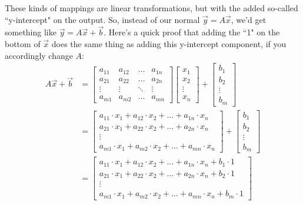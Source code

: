 \documentclass{article}
\begin{document}
These kinds of mappings are linear transformations, but with the added so-called ``y-intercept" on the output. So, instead of our normal $\vec{y} = A\vec{x}$, we'd get something like $\vec{y} = A\vec{x} + \vec{b}$. Here's a quick proof that adding the ``1" on the bottom of $\vec{x}$ does the same thing as adding this y-intercept component, if you accordingly change $A$: \\

\begin{align*}
A\vec{x} + \vec{b} 
&= 
\begin{bmatrix}
a_{11} & a_{12} & \hdots & a_{1n} \\
a_{21} & a_{22} & \hdots & a_{2n} \\
\vdots & \vdots & \ddots & \vdots \\
a_{m1} & a_{m2} & \hdots & a_{mn}
\end{bmatrix}
\begin{bmatrix}
x_1 \\ x_2 \\ \vdots \\ x_n
\end{bmatrix} +
\begin{bmatrix}
b_1 \\ b_2 \\ \vdots \\ b_m
\end{bmatrix} \\
& = 
\begin{bmatrix}
a_{11}\cdot x_1 + a_{12}\cdot x_2 + \hdots + a_{1n}\cdot x_n \\
a_{21}\cdot x_1 + a_{22}\cdot x_2 + \hdots + a_{2n}\cdot x_n \\
\vdots \\
a_{m1}\cdot x_1 + a_{m2}\cdot x_2 + \hdots + a_{mn}\cdot x_n
\end{bmatrix} +
\begin{bmatrix}
b_1 \\ b_2 \\ \vdots \\ b_m
\end{bmatrix} \\
&=
\begin{bmatrix}
a_{11}\cdot x_1 + a_{12}\cdot x_2 + \hdots + a_{1n}\cdot x_n + b_1 \cdot 1\\
a_{21}\cdot x_1 + a_{22}\cdot x_2 + \hdots + a_{2n}\cdot x_n + b_2 \cdot 1\\
\vdots \\
a_{m1}\cdot x_1 + a_{m2}\cdot x_2 + \hdots + a_{mn}\cdot x_n + b_m \cdot 1

\end{bmatrix}
\end{align*}
\end{document}

